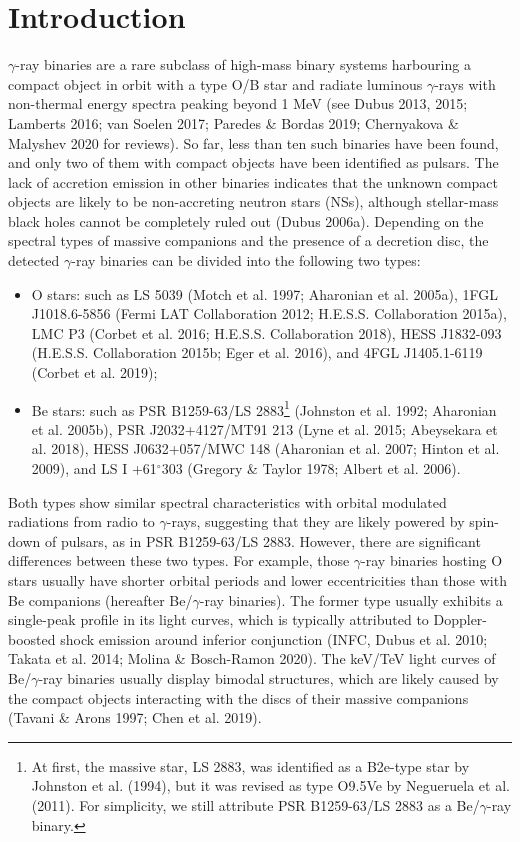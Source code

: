 \documentclass{aa}
\def\PSRB1259{PSR B1259-63/LS 2883}
\begin{document}
\section{Introduction}
$\gamma$-ray binaries are a rare subclass of high-mass binary systems harbouring a compact object in orbit with a type O/B star and radiate luminous $\gamma$-rays with non-thermal energy spectra peaking beyond 1 MeV (see Dubus 2013, 2015; Lamberts 2016; van Soelen 2017; Paredes \& Bordas 2019; Chernyakova \& Malyshev 2020 for reviews).
So far, less than ten such binaries have been found, and only two of them with compact objects have been identified as pulsars. The lack of accretion emission in other binaries indicates that the unknown compact objects are likely to be non-accreting neutron stars (NSs), although stellar-mass black holes cannot be completely ruled out (Dubus 2006a).
Depending on the spectral types of massive companions and the presence of a decretion disc, the detected $\gamma$-ray binaries can be divided into the following two types:
\begin{itemize}
  \item O stars: such as LS 5039 (Motch et al. 1997; Aharonian et al. 2005a),  1FGL J1018.6-5856 (Fermi LAT Collaboration 2012; H.E.S.S. Collaboration 2015a), LMC P3 (Corbet et al. 2016; H.E.S.S. Collaboration 2018), HESS J1832-093 (H.E.S.S. Collaboration 2015b; Eger et al. 2016), and 4FGL J1405.1-6119 (Corbet et al. 2019);
  \item Be stars: such as PSR B1259-63/LS 2883\footnote{At first, the massive star, LS 2883, was identified as a B2e-type star by Johnston et al. (1994), but it was revised as type O9.5Ve by Negueruela et al. (2011). For simplicity, we still attribute \PSRB1259 as a Be/$\gamma$-ray binary.} (Johnston et al. 1992; Aharonian et al. 2005b), PSR J2032+4127/MT91 213 (Lyne et al. 2015; Abeysekara et al. 2018), HESS J0632+057/MWC 148 (Aharonian et al. 2007; Hinton et al. 2009), and LS I +61$^{\circ}$303 (Gregory \& Taylor 1978; Albert et al. 2006).
\end{itemize}
Both types show similar spectral characteristics with orbital modulated radiations from radio to $\gamma$-rays, suggesting that they are likely powered by spin-down of pulsars, as in \PSRB1259. However, there are significant differences between these two types. For example, those $\gamma$-ray binaries hosting O stars usually have shorter orbital periods and lower eccentricities than those with Be companions (hereafter Be/$\gamma$-ray binaries). The former type usually exhibits a single-peak profile in its light curves, which is typically attributed to Doppler-boosted shock emission around inferior conjunction (INFC, Dubus et al. 2010; Takata et al. 2014; Molina \& Bosch-Ramon 2020). The keV/TeV light curves of  Be/$\gamma$-ray binaries usually display bimodal structures, which are likely caused by the compact objects interacting with the discs of their massive companions (Tavani \& Arons 1997; Chen et al. 2019).
\end{document}
